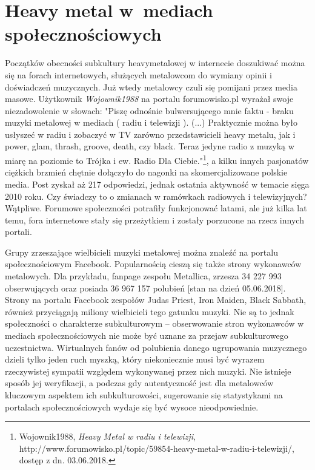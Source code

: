 \documentclass[12pt, a4paper, titlepage]{report}
\begin{document}



\section{Heavy metal w~mediach społecznościowych}
Początków obecności subkultury heavymetalowej w internecie doszukiwać można się na forach internetowych, służących metalowcom do wymiany opinii i doświadczeń muzycznych. Już wtedy metalowcy czuli się pomijani przez media masowe. Użytkownik \textit{Wojownik1988} na portalu forumowisko.pl wyrażał swoje niezadowolenie w słowach: "Piszę odnośnie bulwersującego mnie faktu - braku muzyki metalowej w mediach ( radiu i telewizji ). (...) Praktycznie można było usłyszeć w radiu i zobaczyć w TV zarówno przedstawicieli heavy metalu, jak i power, glam, thrash, groove, death, czy black. Teraz jedyne radio z muzyką w miarę na poziomie to Trójka i ew. Radio Dla Ciebie."\footnote{Wojownik1988, \textit{Heavy Metal w radiu i telewizji}, http://www.forumowisko.pl/topic/59854-heavy-metal-w-radiu-i-telewizji/, dostęp z dn. 03.06.2018.}, a kilku innych pasjonatów ciężkich brzmień chętnie dołączyło do nagonki na skomercjalizowane polskie media. Post zyskał aż 217 odpowiedzi, jednak ostatnia aktywność w temacie sięga 2010 roku. Czy świadczy to o zmianach w ramówkach radiowych i telewizyjnych? Wątpliwe. Forumowe społeczności potrafiły funkcjonować latami, ale już kilka lat temu, fora internetowe stały się przeżytkiem i zostały porzucone na rzecz innych portali.

Grupy zrzeszające wielbicieli muzyki metalowej można znaleźć na portalu społecznościowym Facebook. Popularnością cieszą się także strony wykonawców metalowych. Dla przykładu, fanpage zespołu Metallica, zrzesza 34 227 993 obserwujących oraz posiada 36 967 157 polubień [stan na dzień 05.06.2018]. Strony na portalu Facebook zespołów Judas Priest, Iron Maiden, Black Sabbath, również przyciągają miliony wielbicieli tego gatunku muzyki. Nie są to jednak społeczności o charakterze subkulturowym -- obserwowanie stron wykonawców w mediach społecznościowych nie może być uznane za przejaw subkulturowego uczestnictwa. Wirtualnych fanów od polubienia danego ugrupowania muzycznego dzieli tylko jeden ruch myszką, który niekoniecznie musi być wyrazem rzeczywistej sympatii względem wykonywanej przez nich muzyki. Nie istnieje sposób jej weryfikacji, a podczas gdy autentyczność jest dla metalowców kluczowym aspektem ich subkulturowości, sugerowanie się statystykami na portalach społecznościowych wydaje się być wysoce nieodpowiednie.  
\end{document}
